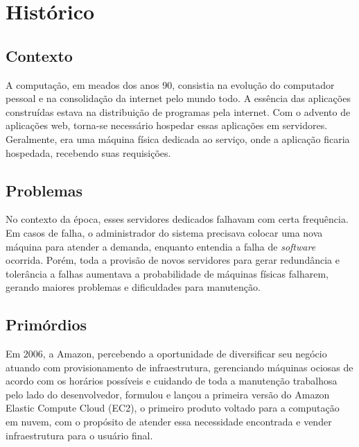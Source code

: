 \chapter{Histórico}

\section{Contexto}

\nocite{precloudcomputing}
A computação, em meados dos anos 90, consistia na evolução do computador pessoal e na consolidação da internet pelo mundo todo. A essência das aplicações construídas estava na distribuição de programas pela internet. Com o advento de aplicações web, torna-se necessário hospedar essas aplicações em servidores. Geralmente, era uma máquina física dedicada ao serviço, onde a aplicação ficaria hospedada, recebendo suas requisições.

\section{Problemas}

No contexto da época, esses servidores dedicados falhavam com certa frequência. Em casos de falha, o administrador do sistema precisava colocar uma nova máquina para atender a demanda, enquanto entendia a falha de \textit{software} ocorrida. Porém, toda a provisão de novos servidores para gerar redundância e tolerância a falhas aumentava a probabilidade de máquinas físicas falharem, gerando maiores problemas e dificuldades para manutenção.

\section{Primórdios}


Em 2006, a Amazon, percebendo a oportunidade de diversificar seu negócio atuando com provisionamento de infraestrutura, gerenciando máquinas ociosas de acordo com os horários possíveis e cuidando de toda a manutenção trabalhosa pelo lado do desenvolvedor, formulou e lançou a primeira versão do Amazon Elastic Compute Cloud (EC2), o primeiro produto voltado para a computação em nuvem, com o propósito de atender essa necessidade encontrada e vender infraestrutura para o usuário final.

